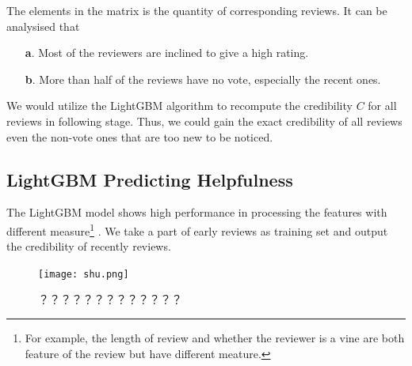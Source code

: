 \documentclass[12pt]{article}%
\begin{document}
The elements in the matrix is the quantity of corresponding reviews. It can be analysised that 
\begin{itemize} 
	\item  [\textbf{a}.] Most of the reviewers are inclined to give a high rating.
	\item  [\textbf{b}.] More than half of the reviews have no vote, especially the recent ones.
\end{itemize}
We would utilize the LightGBM algorithm to recompute the credibility $C$ for all reviews in following stage. Thus, we could gain the exact credibility of all reviews even the non-vote ones that are too new to be noticed.

\subsection{LightGBM Predicting Helpfulness}
The LightGBM\cite{lgb,lgb2} model shows high performance in processing the features with different measure\footnote{\quad For example, the length of review and whether the reviewer is a vine are both feature of the review but have different meature.} . We take a part of early reviews as training set and output the credibility of recently reviews.


\begin{figure}[H]
	\centering
	\texttt{[image: shu.png]}%
	\caption{？？？？？？？？？？？？？}\label{llsaall}%
\end{figure}
\end{document}
